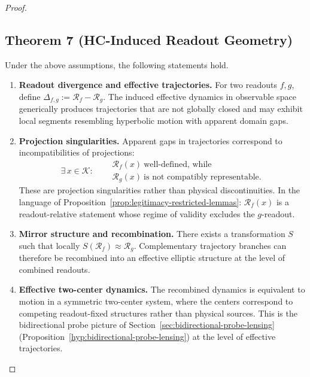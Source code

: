 \begin{proof}
\subsection*{Theorem 7 (HC-Induced Readout Geometry)}

\begin{theorem}
\label{thm:hc-readout-geometry}
Under the above assumptions, the following statements hold.
\begin{enumerate}[label=(\arabic*)]
  \item \textbf{Readout divergence and effective trajectories.}
  For two readouts $f,g$, define
  $\Delta_{f,g} := \mathcal{R}_f - \mathcal{R}_g$.
  The induced effective dynamics in observable space generically
  produces trajectories that are not globally closed and may exhibit
  local segments resembling hyperbolic motion with apparent domain gaps.

  \item \textbf{Projection singularities.}
  Apparent gaps in trajectories correspond to incompatibilities of
  projections:
  \[
    \exists\, x \in \mathcal{K}:\quad
    \begin{aligned}
      &\mathcal{R}_f(x)\ \text{well-defined, while}\\
      &\mathcal{R}_g(x)\ \text{is not compatibly representable.}
    \end{aligned}
  \]
  These are projection singularities rather than physical
  discontinuities. In the language of
  Proposition~\ref{prop:legitimacy-restricted-lemmas}: $\mathcal{R}_f(x)$
  is a readout-relative statement whose regime of validity excludes the
  $g$-readout.

  \item \textbf{Mirror structure and recombination.}
  There exists a transformation $S$ such that locally
  $S(\mathcal{R}_f) \approx \mathcal{R}_g$.
  Complementary trajectory branches can therefore be recombined into
  an effective elliptic structure at the level of combined readouts.

  \item \textbf{Effective two-center dynamics.}
  The recombined dynamics is equivalent to motion in a symmetric
  two-center system, where the centers correspond to competing
  readout-fixed structures rather than physical sources. This is
  the bidirectional probe picture of
  Section~\ref{sec:bidirectional-probe-lensing}
  (Proposition~\ref{hyp:bidirectional-probe-lensing}) at the level of
  effective trajectories.


\end{enumerate}
\end{theorem}
\end{proof}
